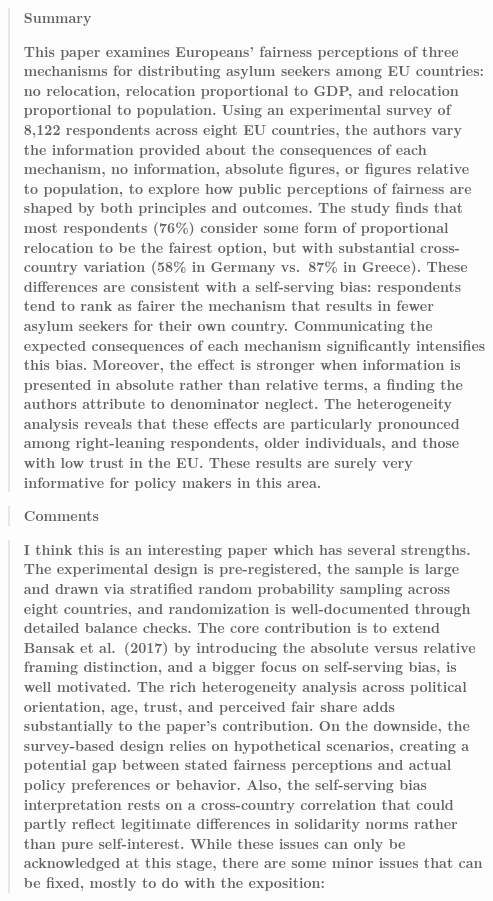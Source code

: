 \documentclass[
  11pt,
]{article}
\begin{document}
\begin{quote}
\textbf{Summary}

\textbf{This paper examines Europeans' fairness perceptions of three mechanisms for distributing asylum seekers among EU countries: no relocation, relocation proportional to GDP, and relocation proportional to population. Using an experimental survey of 8,122 respondents across eight EU countries, the authors vary the information provided about the consequences of each mechanism, no information, absolute figures, or figures relative to population, to explore how public perceptions of fairness are shaped by both principles and outcomes. The study finds that most respondents (76\%) consider some form of proportional relocation to be the fairest option, but with substantial cross-country variation (58\% in Germany vs.~87\% in Greece). These differences are consistent with a self-serving bias: respondents tend to rank as fairer the mechanism that results in fewer asylum seekers for their own country. Communicating the expected consequences of each mechanism significantly intensifies this bias. Moreover, the effect is stronger when information is presented in absolute rather than relative terms, a finding the authors attribute to denominator neglect. The heterogeneity analysis reveals that these effects are particularly pronounced among right-leaning respondents, older individuals, and those with low trust in the EU. These results are surely very informative for policy makers in this area.}
\end{quote}

\begin{quote}
\textbf{Comments}
\end{quote}

\begin{quote}
\textbf{I think this is an interesting paper which has several strengths. The experimental design is pre-registered, the sample is large and drawn via stratified random probability sampling across eight countries, and randomization is well-documented through detailed balance checks. The core contribution is to extend Bansak et al.~(2017) by introducing the absolute versus relative framing distinction, and a bigger focus on self-serving bias, is well motivated. The rich heterogeneity analysis across political orientation, age, trust, and perceived fair share adds substantially to the paper's contribution. On the downside, the survey-based design relies on hypothetical scenarios, creating a potential gap between stated fairness perceptions and actual policy preferences or behavior. Also, the self-serving bias interpretation rests on a cross-country correlation that could partly reflect legitimate differences in solidarity norms rather than pure self-interest. While these issues can only be acknowledged at this stage, there are some minor issues that can be fixed, mostly to do with the exposition:}
\end{quote}
\end{document}
